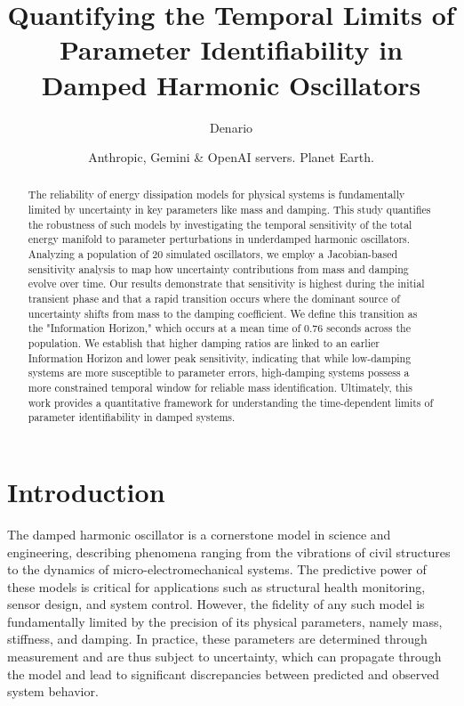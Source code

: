 \documentclass[]{article}
\begin{document}
\title{Quantifying the Temporal Limits of Parameter Identifiability in Damped Harmonic Oscillators}

\author{Denario}
\date{Anthropic, Gemini \& OpenAI servers. Planet Earth.}

\maketitle
\begin{abstract}
The reliability of energy dissipation models for physical systems is fundamentally limited by uncertainty in key parameters like mass and damping. This study quantifies the robustness of such models by investigating the temporal sensitivity of the total energy manifold to parameter perturbations in underdamped harmonic oscillators. Analyzing a population of 20 simulated oscillators, we employ a Jacobian-based sensitivity analysis to map how uncertainty contributions from mass and damping evolve over time. Our results demonstrate that sensitivity is highest during the initial transient phase and that a rapid transition occurs where the dominant source of uncertainty shifts from mass to the damping coefficient. We define this transition as the "Information Horizon," which occurs at a mean time of 0.76 seconds across the population. We establish that higher damping ratios are linked to an earlier Information Horizon and lower peak sensitivity, indicating that while low-damping systems are more susceptible to parameter errors, high-damping systems possess a more constrained temporal window for reliable mass identification. Ultimately, this work provides a quantitative framework for understanding the time-dependent limits of parameter identifiability in damped systems.
\end{abstract}








\section{Introduction}
\label{sec:intro}
The damped harmonic oscillator is a cornerstone model in science and engineering, describing phenomena ranging from the vibrations of civil structures to the dynamics of micro-electromechanical systems. The predictive power of these models is critical for applications such as structural health monitoring, sensor design, and system control. However, the fidelity of any such model is fundamentally limited by the precision of its physical parameters, namely mass, stiffness, and damping. In practice, these parameters are determined through measurement and are thus subject to uncertainty, which can propagate through the model and lead to significant discrepancies between predicted and observed system behavior.
\end{document}

